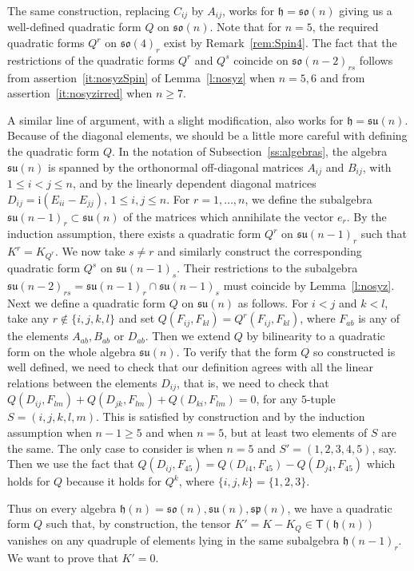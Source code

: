 \documentclass[12pt,reqno]{amsart}
\newcommand \sT{\mathsf{T}}
\newcommand\h{\mathfrak h}
\newcommand \so{\mathfrak{so}}
\newcommand \spg{\mathfrak{sp}}
\newcommand \su{\mathfrak{su}}
\newcommand \ir{\mathrm{i}}
\newcommand \<{\langle}
\renewcommand \>{\rangle}
\theoremstyle{definition}
\theoremstyle{remark}
\begin{document}
	The same construction, replacing $C_{ij}$ by $A_{ij}$, works for $\h=\so(n)$ giving us a well-defined quadratic form $Q$ on $\so(n)$. Note that for $n=5$, the required quadratic forms $Q^r$ on $\so(4)_r$ exist by Remark~\ref{rem:Spin4}. The fact that the restrictions of the quadratic forms $Q^r$ and $Q^s$ coincide on $\so(n-2)_{rs}$ follows from assertion~\eqref{it:nosyzSpin} of Lemma~\ref{l:nosyz} when $n=5,6$ and from assertion~\eqref{it:nosyzirred} when $n \ge 7$.
	
	A similar line of argument, with a slight modification, also works for $\h = \su(n)$. Because of the diagonal elements, we should be a little more careful with defining the quadratic form $Q$. In the notation of Subsection~\ref{ss:algebras}, the algebra $\su(n)$ is spanned by the orthonormal off-diagonal matrices $A_{ij}$ and $B_{ij}$, with $1 \le i < j\le n$, and by the linearly dependent diagonal matrices $D_{ij} = \ir (E_{ii}- E_{jj}), \, 1 \le i, j\le n$. For $r=1, \dots, n$, we define the subalgebra $\su(n-1)_r \subset \su(n)$ of the matrices which annihilate the vector $e_r$. By the induction assumption, there exists a quadratic form $Q^r$ on $\su(n-1)_r$ such that $K^r = K_{Q^r}$. We now take $s \ne r$ and similarly construct the corresponding quadratic form $Q^s$ on $\su(n-1)_s$. Their restrictions to the subalgebra $\su(n-2)_{rs} = \su(n-1)_r \cap \su(n-1)_s$ must coincide by Lemma~\ref{l:nosyz}. Next we define a quadratic form $Q$ on $\su(n)$ as follows. For $i < j$ and $k < l$, take any $r \notin \{i,j,k,l\}$ and set $Q(F_{ij}, F_{kl}) = Q^r(F_{ij}, F_{kl})$, where $F_{ab}$ is any of the elements $A_{ab}, B_{ab}$ or $D_{ab}$. Then we extend $Q$ by bilinearity to a quadratic form on the whole algebra $\su(n)$. To verify that the form $Q$ so constructed is well defined, we need to check that our definition agrees with all the linear relations between the elements $D_{ij}$, that is, we need to check that $Q(D_{ij}, F_{lm}) + Q(D_{jk}, F_{lm}) + Q(D_{ki}, F_{lm}) = 0$, for any $5$-tuple $S=(i,j,k,l,m)$. This is satisfied by construction and by the induction assumption when $n-1 \ge 5$ and when $n = 5$, but at least two elements of $S$ are the same. The only case to consider is when $n=5$ and $S'=(1,2,3,4,5)$, say. Then we use the fact that $Q(D_{ij}, F_{45}) = Q(D_{i4}, F_{45}) - Q(D_{j4}, F_{45})$ which holds for $Q$ because it holds for $Q^k$, where $\{i,j,k\} = \{1,2,3\}$.
	
	Thus on every algebra $\h(n) = \so(n), \su(n), \spg(n)$, we have a quadratic form $Q$ such that, by construction, the tensor $K' = K - K_Q \in \sT(\h(n))$ vanishes on any quadruple of elements lying in the same subalgebra $\h(n-1)_r$. We want to prove that $K' = 0$.
	
\end{document}
